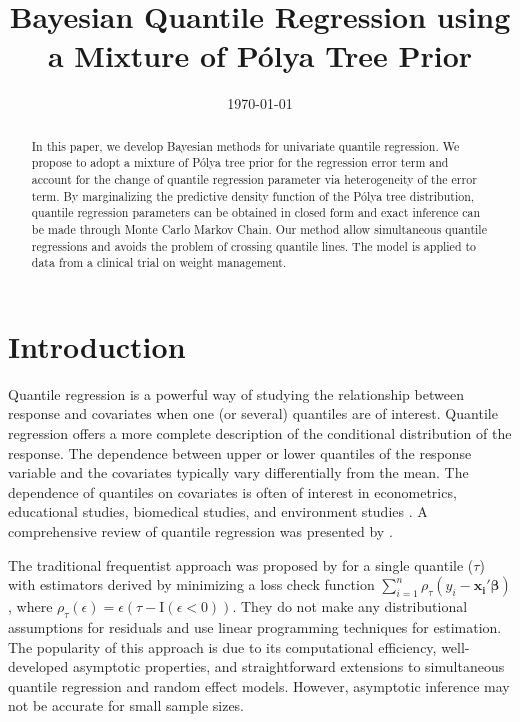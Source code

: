 \documentclass[12pt]{article}
\title{Bayesian Quantile Regression using a  Mixture of P\'{o}lya Tree Prior}
\date{\today}
\author{}
\newcommand{\polya}{P\'{o}lya}
\begin{document}

\maketitle{}

\begin{abstract}
  In this paper, we develop Bayesian methods for univariate quantile regression.
We propose to adopt a mixture of \polya{} tree prior for the regression error term
and account for the change of quantile regression parameter via heterogeneity of the error term.
By marginalizing the predictive density function of the \polya{} tree distribution,
quantile regression parameters can be obtained in closed form and exact inference can be made through Monte Carlo Markov Chain.
Our method allow simultaneous quantile regressions and avoids the problem of crossing quantile lines.
The model is applied to data from a clinical trial on weight management.
\end{abstract}

\section{Introduction}

Quantile regression is a powerful way of studying the relationship
between response and covariates when one (or several) quantiles are of
interest.
Quantile regression offers a more complete description of the
conditional distribution of the response.
The dependence between upper or lower quantiles of the
response variable and the covariates typically vary
differentially from the mean. The dependence of quantiles on covariates is often of
interest in econometrics, educational studies, biomedical studies, and
environment studies \citep{yu2001,buchinsky1994,
  buchinsky1998,he1998,koenker1999, wei2006, yu2003}.  A comprehensive
review of quantile regression was presented by \citet{koenker2005}.

The traditional frequentist approach was proposed by
\citet{koenker1978} for a single quantile ($\tau$) with estimators
derived by minimizing a loss check function $\sum_{i=1}^n
\rho_{\tau}(y_i - \bm{x_i'\beta})$, where $\rho_{\tau}(\epsilon) =
\epsilon (\tau- \mathrm{I}(\epsilon < 0))$. They do not make any
distributional assumptions for residuals and use linear programming
techniques for estimation.  The popularity of this approach is due to
its computational efficiency, well-developed asymptotic properties,
and straightforward extensions to simultaneous quantile regression and
random effect models. However, asymptotic inference may not be
accurate for small sample sizes.
\end{document}
